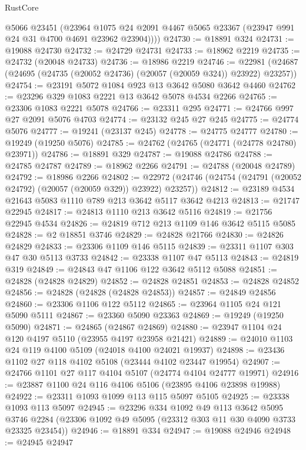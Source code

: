 \begin{lexlean}{RustCore}
\begin{coremodule}
        @5066
        @23451
        (@23964
          @1075
          @24
          @2091
          @4467
          @5065
          @23367
          (@23947 @991 @24 @31 @4700 @4691 @23962 @23904))))
@24730 := @18891 @324
@24731 := @19088 @24730
@24732 := @24729 @24731
@24733 := @18962 @2219
@24735 := @24732 (@20048 @24733)
@24736 := @18986 @2219
@24746 := @22981 (@24687 (@24695 (@24735 (@20052 @24736) (@20057 (@20059 @324)) @23922) @23257))
@24754 := @23191 @5072 @1084 @923 @13 @3642 @5080 @3642 @4460
@24762 := @23296 @329 @1083 @2221 @13 @3642 @5078 @4534 @2266
@24765 := @23306 @1083 @2221 @5078
@24766 := @23311 @295
@24771 := @24766 @997 @27 @2091 @5076 @4703
@24774 := @23132 @245 @27 @245
@24775 := @24774 @5076
@24777 := @19241 (@23137 @245)
@24778 := @24775 @24777
@24780 := @19249 (@19250 @5076)
@24785 := @24762 (@24765 (@24771 (@24778 @24780) @23971))
@24786 := @18891 @329
@24787 := @19088 @24786
@24788 := @24785 @24787
@24789 := @18962 @2266
@24791 := @24788 (@20048 @24789)
@24792 := @18986 @2266
@24802 := @22972 (@24746 (@24754 (@24791 (@20052 @24792) (@20057 (@20059 @329)) @23922) @23257))
@24812 := @23189 @4534 @21643 @5083 @1110 @789 @213 @3642 @5117 @3642 @4213
@24813 := @21747 @22945
@24817 := @24813 @1110 @213 @3642 @5116
@24819 := @21756 @22945 @4534
@24826 := @24819 @712 @213 @1109 @146 @3642 @5115 @5085
@24828 := @2 @18851 @3746
@24829 := @24828 @21766
@24830 := @24826 @24829
@24833 := @23306 @1109 @146 @5115
@24839 := @23311 @1107 @303 @47 @30 @5113 @3733
@24842 := @23338 @1107 @47 @5113
@24843 := @24819 @319
@24849 := @24843 @47 @1106 @122 @3642 @5112 @5088
@24851 := @24828 (@24828 @24829)
@24852 := @24828 @24851
@24853 := @24828 @24852
@24856 := @24828 (@24828 (@24828 @24853))
@24857 := @24849 @24856
@24860 := @23306 @1106 @122 @5112
@24865 := @23964 @1105 @24 @121 @5090 @5111
@24867 := @23360 @5090 @23363
@24869 := @19249 (@19250 @5090)
@24871 := @24865 (@24867 @24869)
@24880 := @23947 @1104 @24 @120 @4197 @5110 (@23955 @4197 @23958 @21421)
@24889 := @24010 @1103 @24 @119 @4100 @5109 (@24018 @4100 @24021 @19937)
@24898 := @23436 @1102 @27 @118 @4102 @5108 (@23444 @4102 @23447 @19954)
@24907 := @24766 @1101 @27 @117 @4104 @5107 (@24774 @4104 @24777 @19971)
@24916 := @23887 @1100 @24 @116 @4106 @5106 (@23895 @4106 @23898 @19988)
@24922 := @23311 @1093 @1099 @113 @115 @5097 @5105
@24925 := @23338 @1093 @113 @5097
@24945 := @23296
    @334
    @1092
    @49
    @113
    @3642
    @5095
    @3746
    @2284
    (@23306 @1092 @49 @5095 (@23312 @303 @11 @30 @4090 @3733 @23325 @23454))
@24946 := @18891 @334
@24947 := @19088 @24946
@24948 := @24945 @24947

\end{coremodule}
\end{lexlean}
